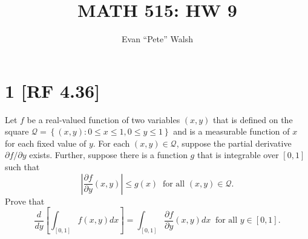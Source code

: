 \documentclass[12pt]{article}
\title{MATH 515: HW 9}
\author{Evan ``Pete'' Walsh}
\begin{document}

\section*{1 [RF 4.36]}
Let $f$ be a real-valued function of two variables $(x,y)$ that is defined on the square $\mathcal{Q} = \left\{ (x,y) : 0 \leq x \leq 1, 0\leq y \leq
1 \right\}$ and is a measurable function of $x$ for each fixed value of $y$. For each $(x,y) \in \mathcal{Q}$, suppose the partial derivative $\partial f
/ \partial y$ exists. Further, suppose there is a function $g$ that is integrable over $[0,1]$ such that 
\[ \left| \frac{\partial f}{\partial y}(x,y)\right| \leq g(x) \ \text{ for all }(x,y) \in \mathcal{Q}. \]
Prove that 
\[ \frac{d}{dy}\left[ \int_{[0,1]}f(x,y)dx \right] = \int_{[0,1]}\frac{\partial f}{\partial y}(x,y)dx \ \text{ for all }y \in [0,1]. \]
\end{document}
